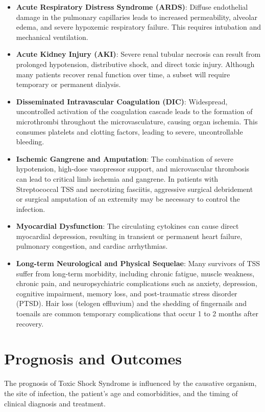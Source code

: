 \begin{itemize}
    \item \textbf{Acute Respiratory Distress Syndrome (ARDS)}: Diffuse endothelial damage in the pulmonary capillaries leads to increased permeability, alveolar edema, and severe hypoxemic respiratory failure. This requires intubation and mechanical ventilation.
    \item \textbf{Acute Kidney Injury (AKI)}: Severe renal tubular necrosis can result from prolonged hypotension, distributive shock, and direct toxic injury. Although many patients recover renal function over time, a subset will require temporary or permanent dialysis.
    \item \textbf{Disseminated Intravascular Coagulation (DIC)}: Widespread, uncontrolled activation of the coagulation cascade leads to the formation of microthrombi throughout the microvasculature, causing organ ischemia. This consumes platelets and clotting factors, leading to severe, uncontrollable bleeding.
    \item \textbf{Ischemic Gangrene and Amputation}: The combination of severe hypotension, high-dose vasopressor support, and microvascular thrombosis can lead to critical limb ischemia and gangrene. In patients with Streptococcal TSS and necrotizing fasciitis, aggressive surgical debridement or surgical amputation of an extremity may be necessary to control the infection.
    \item \textbf{Myocardial Dysfunction}: The circulating cytokines can cause direct myocardial depression, resulting in transient or permanent heart failure, pulmonary congestion, and cardiac arrhythmias.
    \item \textbf{Long-term Neurological and Physical Sequelae}: Many survivors of TSS suffer from long-term morbidity, including chronic fatigue, muscle weakness, chronic pain, and neuropsychiatric complications such as anxiety, depression, cognitive impairment, memory loss, and post-traumatic stress disorder (PTSD). Hair loss (telogen effluvium) and the shedding of fingernails and toenails are common temporary complications that occur 1 to 2 months after recovery.
\end{itemize}

\section*{Prognosis and Outcomes}
The prognosis of Toxic Shock Syndrome is influenced by the causative organism, the site of infection, the patient's age and comorbidities, and the timing of clinical diagnosis and treatment.

